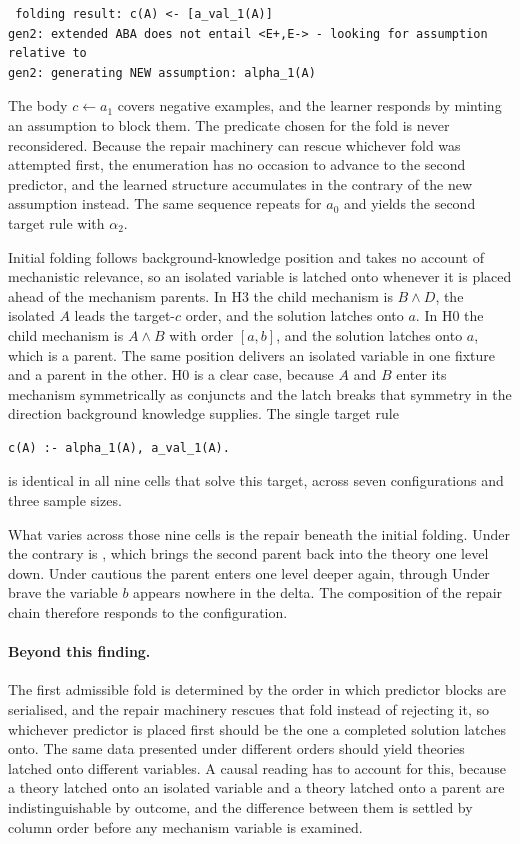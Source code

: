 \documentclass[11pt]{article}
\DeclareRobustCommand{\code}[1]{\texttt{\detokenize{#1}}}
\newcommand{\beyond}{\paragraph{Beyond this finding.}}
\begin{document}
\begin{lstlisting}
 folding result: c(A) <- [a_val_1(A)]
gen2: extended ABA does not entail <E+,E-> - looking for assumption relative to
gen2: generating NEW assumption: alpha_1(A)
\end{lstlisting}

The body \(c\leftarrow a_1\) covers negative examples, and the learner responds by
minting an assumption to block them. The predicate chosen for the fold is never
reconsidered. Because the repair machinery can rescue whichever fold was attempted
first, the enumeration has no occasion to advance to the second predictor, and the
learned structure accumulates in the contrary of the new assumption instead. The
same sequence repeats for \(a_0\) and yields the second target rule with
\(\alpha_2\).

Initial folding follows background-knowledge position and takes no account of
mechanistic relevance, so an isolated variable is latched onto whenever it is placed
ahead of the mechanism parents. In H3 the child mechanism is \(B\land D\), the
isolated \(A\) leads the target-\(c\) order, and the solution latches onto \(a\).
In H0 the child mechanism is \(A\land B\) with order \([a,b]\), and the solution
latches onto \(a\), which is a parent. The same position delivers an isolated
variable in one fixture and a parent in the other. H0 is a clear case, because
\(A\) and \(B\) enter its mechanism symmetrically as conjuncts and the latch breaks
that symmetry in the direction background knowledge supplies. The single target
rule

\begin{lstlisting}
c(A) :- alpha_1(A), a_val_1(A).
\end{lstlisting}

is identical in all nine cells that solve this target, across seven configurations
and three sample sizes.

What varies across those nine cells is the repair beneath the initial folding. Under
\code{relto} the contrary is \code{c_alpha_1(A) :- b_val_0(A).}, which brings the
second parent back into the theory one level down. Under cautious \code{sechk} the
parent enters one level deeper again, through \code{c_alpha_2(A) :- b_val_1(A).}
Under brave \code{sechk} the variable \(b\) appears nowhere in the delta. The
composition of the repair chain therefore responds to the configuration. 

\beyond
The first admissible fold is determined by the order in which
predictor blocks are serialised, and the repair machinery rescues that fold instead
of rejecting it, so whichever predictor is placed first should be the one a
completed solution latches onto. The same data presented under different orders should yield
theories latched onto different variables. A causal reading has to account for this, because a theory latched onto
an isolated variable and a theory latched onto a parent are indistinguishable by
outcome, and the difference between them is settled by column order before any
mechanism variable is examined.
\end{document}

